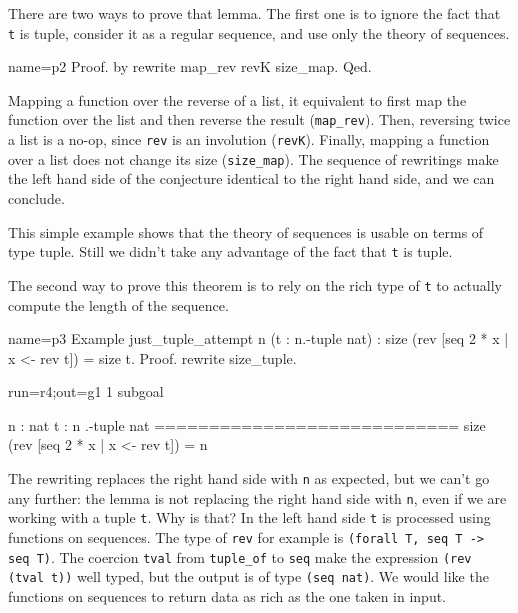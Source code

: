 There are two ways to prove that lemma.  The first one is
to ignore the fact that \lstinline/t/ is tuple, consider it
as a regular sequence, and use only the theory of sequences.

\begin{coq}{name=p2}{}
Proof. by rewrite map_rev revK size_map. Qed.
\end{coq}

Mapping a function over the reverse of a list, it equivalent to
first map the function over the list and then reverse the result
(\lstinline/map_rev/).  Then, reversing twice a list is a no-op, since
\lstinline/rev/ is an involution
(\lstinline/revK/).  Finally, mapping a function over a list does not
change its size (\lstinline/size_map/).  The sequence of rewritings
make the left hand side of the conjecture identical to the right hand
side, and we can conclude.

This simple example shows that the theory of sequences is usable
on terms of type tuple.  Still we didn't take any advantage of
the fact that  \lstinline/t/ is tuple.

The second way to prove this theorem is to rely on the rich type
of \lstinline/t/ to actually compute the length of the sequence.

\begin{coq}{name=p3}{}
Example just_tuple_attempt n (t : n.-tuple nat) :
  size (rev [seq 2 * x | x <- rev t]) = size t.
Proof. rewrite size_tuple.
\end{coq}
\begin{coqout}{run=r4;out=g1}{}
1 subgoal

 n : nat
 t : n .-tuple nat
 ============================
 size (rev [seq 2 * x | x <- rev t]) = n
\end{coqout}

The rewriting replaces the right hand side with \lstinline/n/ as
expected, but we can't go any further: the lemma is not replacing
the right hand side with \lstinline/n/, even if we are working
with a tuple \lstinline/t/.  Why is that?  In the left hand side
\lstinline/t/ is processed using functions on sequences.
The type of \lstinline/rev/ for example is
\lstinline/(forall T, seq T -> seq T)/.  The coercion \lstinline/tval/
from \lstinline/tuple_of/ to \lstinline/seq/ make the
expression \lstinline/(rev (tval t))/ well typed, but the output
is of type \lstinline/(seq nat)/.  
We would like the functions on sequences to return
data as rich as the one taken in input.

